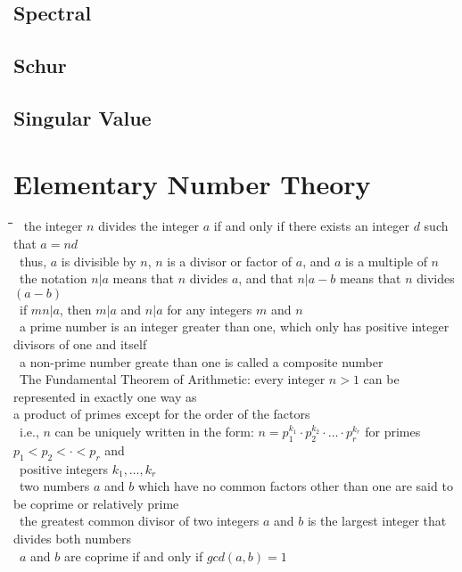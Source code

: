 \documentclass[10pt,letterpaper]{scrartcl}
\newcommand{\tbul}{\textbullet}
\newcommand{\tend}{\>\textendash}
\newcommand{\tabDef}{\hspace{2em}\=\hspace{2em}\=\hspace{2em}\=\hspace{2em}\=\kill}
\begin{document}
\subsection{Spectral}
\subsection{Schur}
\subsection{Singular Value}


\newpage\section{Elementary Number Theory}
\begin{tabbing}\tabDef
\tbul\ the integer $n$ divides the integer $a$ if and only if there exists an integer $d$ such that $a=nd$ \\
    \tend\ thus, $a$ is divisible by $n$, $n$ is a divisor or factor of $a$, and $a$ is a multiple of $n$ \\
    \tend\ the notation $n|a$ means that $n$ divides $a$, and that $n|a-b$ means that $n$ divides $(a-b)$ \\
\tbul\ if $mn|a$, then $m|a$ and $n|a$ for any integers $m$ and $n$ \\
\tbul\ a prime number is an integer greater than one, which only has positive integer divisors of one and itself \\
    \tend\ a non-prime number greate than one is called a composite number \\
\tbul\ The Fundamental Theorem of Arithmetic: every integer $n>1$ can be represented in exactly one way as \\ a product of primes except for the order of the factors \\
    \tend\ i.e., $n$ can be uniquely written in the form: $n=p_1^{k_1}\cdot p_2^{k_2}\cdot\ldots\cdot p_r^{k_r}$ for primes $p_1 < p_2 < \cdot < p_r$ and \\ \>\ positive integers $k_1,\ldots ,k_r$ \\
\tbul\ two numbers $a$ and $b$ which have no common factors other than one are said to be coprime or relatively prime \\
\tbul\ the greatest common divisor of two integers $a$ and $b$ is the largest integer that divides both numbers \\
\tbul\ $a$ and $b$ are coprime if and only if $gcd(a,b)=1$\\

\end{tabbing}
\end{document}
